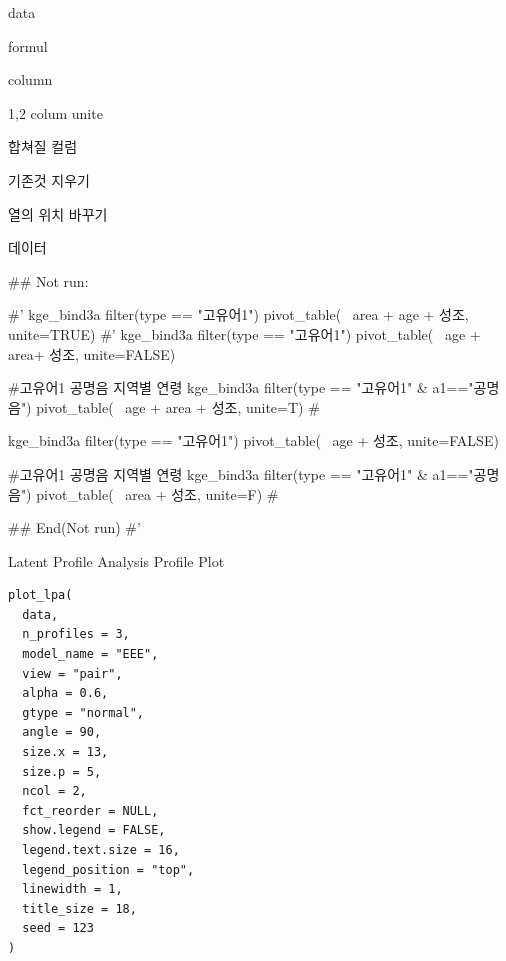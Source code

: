 \documentclass[a4paper]{book}
\begin{document}
%
\begin{Arguments}
\begin{ldescription}
\item[\code{data}] data

\item[\code{formula}] formul

\item[\code{names\_from}] column

\item[\code{unite}] 1,2 colum unite

\item[\code{col}] 합쳐질 컬럼

\item[\code{remove}] 기존것 지우기

\item[\code{change\_col}] 열의 위치 바꾸기
\end{ldescription}
\end{Arguments}
%
\begin{Value}
데이터
\end{Value}
%
\begin{Examples}
\begin{ExampleCode}

\#\# Not run: 

#' kge_bind3a %
filter(type == "고유어1")%
  pivot_table(~ area + age + 성조, unite=TRUE)
#'
kge_bind3a %
  filter(type == "고유어1")%
  pivot_table(~  age + area+ 성조, unite=FALSE)

#고유어1 공명음  지역별 연령
kge_bind3a %
  filter(type == "고유어1" & a1=="공명음")%
  pivot_table(~ age + area + 성조, unite=T)  #%



kge_bind3a %
  filter(type == "고유어1")%
  pivot_table(~  age +  성조, unite=FALSE)

#고유어1 공명음  지역별 연령
kge_bind3a %
  filter(type == "고유어1" & a1=="공명음")%
  pivot_table(~  area + 성조, unite=F)  #%


  
## End(Not run)
#'

\end{ExampleCode}
\end{Examples}
%
\begin{Description}
Latent Profile Analysis Profile Plot
\end{Description}
%
\begin{Usage}
\begin{verbatim}
plot_lpa(
  data,
  n_profiles = 3,
  model_name = "EEE",
  view = "pair",
  alpha = 0.6,
  gtype = "normal",
  angle = 90,
  size.x = 13,
  size.p = 5,
  ncol = 2,
  fct_reorder = NULL,
  show.legend = FALSE,
  legend.text.size = 16,
  legend_position = "top",
  linewidth = 1,
  title_size = 18,
  seed = 123
)
\end{verbatim}
\end{Usage}
\end{document}

